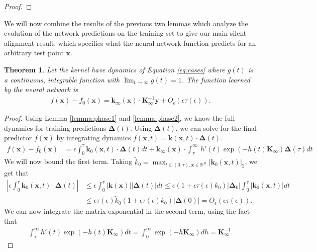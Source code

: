 \documentclass{article} %
\def\x{\bm x}
\newtheorem{theorem}{Theorem}
\begin{document}
\begin{appendix}
\begin{proof}
\end{proof}
We will now combine the results of the previous two lemmas which analyze the evolution of the network predictions on the training set to give our main silent alignment result, which specifies what the neural network function predicts for an arbitrary test point $\x$.
\begin{theorem}
Let the kernel have dynamics of Equation \ref{eq:cases} where $g(t)$ is a continuous, integrable function with $\lim_{t \to \infty} g(t) = 1$. The function learned by the neural network is
\begin{align}
    f(\x) - f_0(\x)  = \bm k_{\infty}(\x) \cdot \bm K_{\infty}^{-1} \bm y + O_{\epsilon}(\epsilon \tau(\epsilon) ).
\end{align}
\end{theorem}
\begin{proof}
Using Lemma \ref{lemma:phase1} and \ref{lemma:phase2}, we know the full dynamics for training predictions $\bm\Delta(t)$. Using $\bm\Delta(t)$, we can solve for the final predictor $f(\x)$ by integrating dynamics $\dot{f}(\x,t) = \bm k(\x,t) \cdot \bm\Delta(t)$.
\begin{align}
    f(\x) - f_0(\x) &=  \epsilon \int_0^{\tau} \bm k_{0}(\x,t) \cdot \bm\Delta(t) dt + \bm k_{\infty}(\x) \cdot  \int_{\tau}^{\infty}  \ h'(t) \exp\left( -h(t) \bm K_{\infty} \right)  \bm\Delta(\tau) dt 
\end{align}
We will now bound the first term. Taking $\tilde{k}_0 = \max_{t\in(0,\tau) ,\x \in \mathbb{R}^D} |\bm k_0(\x, t)|_2$, we get that
\begin{equation}
\begin{aligned}
   \left|\epsilon \int_0^\tau \bm k_0(\x,t) \cdot \bm\Delta(t) \right| &\leq \epsilon \int_0^\tau |\bm k(\x)| |\bm\Delta(t)| dt \leq \epsilon (1+\epsilon \tau(\epsilon) k_0 )|\bm\Delta_0| \int_0^\tau |\bm k_0(\x,t)| dt \nonumber \\
   &\leq \epsilon \tau(\epsilon) \tilde{k}_0 (1+\epsilon \tau(\epsilon) k_0 )  |\bm\Delta(0)| = O_{\epsilon}(\epsilon \tau(\epsilon)).
\end{aligned}
\end{equation}
We can now integrate the matrix exponential in the second term, using the fact that
\begin{align}
    \int_{\tau}^{\infty} h'(t) \exp\left( -h(t) \bm K_{\infty} \right) dt = \int_0^\infty \exp\left( -h \bm K_{\infty} \right) dh = \bm K_{\infty}^{-1}.

\end{align}
\end{proof}
\end{appendix}
\end{document}
